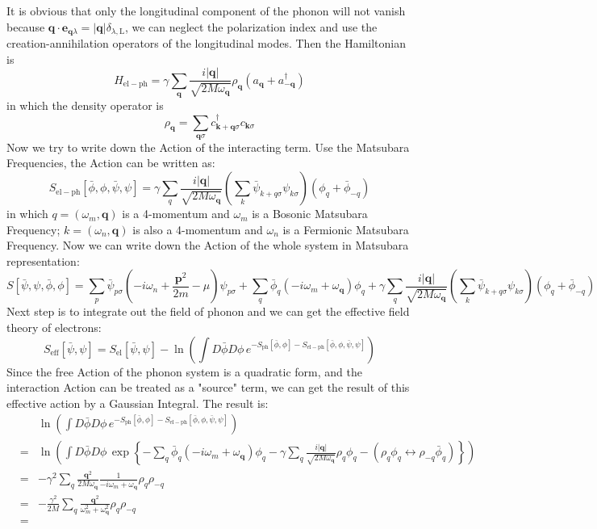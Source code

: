 \documentclass{article}
\newcommand{\mtp}{\mathbf{p}}
\newcommand{\mtq}{\mathbf{q}}
\newcommand{\mtk}{\mathbf{k}}
\begin{document}
It is obvious that only the longitudinal component of the phonon will not vanish because $\mtq\cdot\mathbf{e}_{\mtq\lambda} = |\mtq|\delta_{\lambda,\mathrm{L}} $, we can neglect the polarization index and use the creation-annihilation operators of the longitudinal modes. Then the Hamiltonian is
\begin{equation}
H_{\mathrm{el-ph}} = \gamma \sum_{\mtq}\frac{i|\mtq|}{\sqrt{2M\omega_{\mtq}}} \rho_{\mtq}(a_{\mtq}+ a^\dagger_{-\mtq}) 
\end{equation}
in which the density operator is
$$
\rho_{\mtq} = \sum_{\mtq\sigma} c^\dagger_{\mtk+\mtq\sigma}c_{\mtk\sigma}
$$
Now we try to write down the Action of the interacting term. Use the Matsubara Frequencies, the Action can be written as:
\begin{equation}
S_{\mathrm{el-ph}}[\bar{\phi},\phi,\bar{\psi},\psi] = \gamma \sum_{q}\frac{i|\mtq|}{\sqrt{2M\omega_\mtq}}\left(\sum_k \bar{\psi}_{k+q\sigma}\psi_{k\sigma} \right)(\phi_{q}+ \bar{\phi}_{-q}) 
\end{equation}
in which $q = (\omega_m, \mtq)$ is a 4-momentum and $\omega_m$ is a Bosonic Matsubara Frequency; $k = (\omega_n,\mtq)$ is also a 4-momentum and $\omega_n$ is a Fermionic Matsubara Frequency. Now we can write down the Action of the whole system in Matsubara representation:
\begin{equation}
S[\bar{\psi},\psi,\bar{\phi},\phi] = \sum_{p}\bar{\psi}_{p\sigma}\left(-i\omega_n +\frac{\mtp^2}{2m}-\mu\right)\psi_{p\sigma} + \sum_q \bar{\phi}_q(-i\omega_m+\omega_\mtq)\phi_q +  \gamma \sum_{q}\frac{i|\mtq|}{\sqrt{2M\omega_\mtq}}\left(\sum_k \bar{\psi}_{k+q\sigma}\psi_{k\sigma} \right)(\phi_{q}+ \bar{\phi}_{-q}) 
\end{equation}
Next step is to integrate out the field of phonon and we can get the effective field theory of electrons:
\begin{equation}
S_{\mathrm{eff}}[\bar{\psi},\psi] = S_{\mathrm{el}}[\bar{\psi},\psi] - \ln{\left(\int D\bar{\phi}D\phi\,e^{-S_{\mathrm{ph}}[\bar{\phi},\phi]-S_{\mathrm{el-ph}}[\bar{\phi},\phi,\bar{\psi},\psi]}\right)}
\end{equation}
Since the free Action of the phonon system is a quadratic form, and the interaction Action can be treated as a "source" term, we can get the result of this effective action by a Gaussian Integral. The result is:
\begin{eqnarray}
& & \ln\left(\int D\bar\phi D\phi\,e^{-S_{\mathrm{ph}}[\bar{\phi},\phi]-S_{\mathrm{el-ph}}[\bar{\phi},\phi,\bar{\psi},\psi]}\right)\nonumber\\
&=& \ln\left(\int D\bar\phi D\phi\, \exp\left\{- \sum_q \bar{\phi}_q(-i\omega_m+\omega_\mtq)\phi_q - \gamma\sum_q \frac{i|\mtq|}{\sqrt{2M\omega_\mtq}}\rho_q\phi_q - (\rho_q\phi_q\leftrightarrow\rho_{-q}\bar{\phi}_{q}) \right\}\right)\nonumber\\
&=& - \gamma^2 \sum_q \frac{\mtq^2}{2M\omega_\mtq}\frac{1}{-i\omega_m+ \omega_\mtq}\rho_q\rho_{-q}\nonumber\\
&=& -\frac{\gamma^2}{2M}\sum_q \frac{\mtq^2}{\omega_m^2 + \omega_\mtq^2}\rho_q\rho_{-q}\nonumber\\
&=& 
\end{eqnarray}
\end{document}
